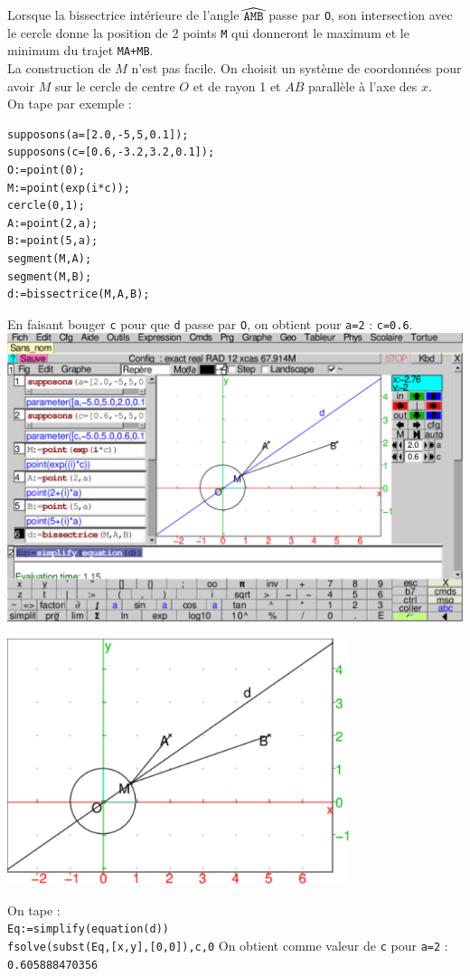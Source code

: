 \documentclass[a4paper,11pt]{book}
\begin{document}
Lorsque la bissectrice int\'erieure de l'angle 
${\tt \widehat{AMB}}$ passe par {\tt O}, son intersection avec le cercle donne 
la position de  2 points {\tt M} qui donneront le maximum et le minimum du 
trajet {\tt MA+MB}.\\
La construction de $M$ n'est pas facile. On choisit un syst\`eme de 
coordonn\'ees pour avoir $M$ sur le cercle de centre $O$ et de rayon 1 et
$AB$ parall\`ele \`a l'axe des $x$.\\
On tape par exemple :
\begin{verbatim}
supposons(a=[2.0,-5,5,0.1]);
supposons(c=[0.6,-3.2,3.2,0.1]);
O:=point(0);
M:=point(exp(i*c));
cercle(0,1);
A:=point(2,a);
B:=point(5,a);
segment(M,A);
segment(M,B);
d:=bissectrice(M,A,B);
\end{verbatim}
En faisant bouger {\tt c} pour que {\tt d} passe par {\tt O}, on obtient 
 pour {\tt a=2}  : {\tt c=0.6}.\\
\includegraphics[width=\textwidth]{mabow}
\begin{center}\includegraphics[width=10cm]{mabo}\end{center}
On tape :\\
{\tt Eq:=simplify(equation(d))}\\
{\tt fsolve(subst(Eq,[x,y],[0,0]),c,0}
On obtient comme valeur de {\tt c} pour {\tt a=2} :\\
{\tt 0.605888470356}
\end{document}
